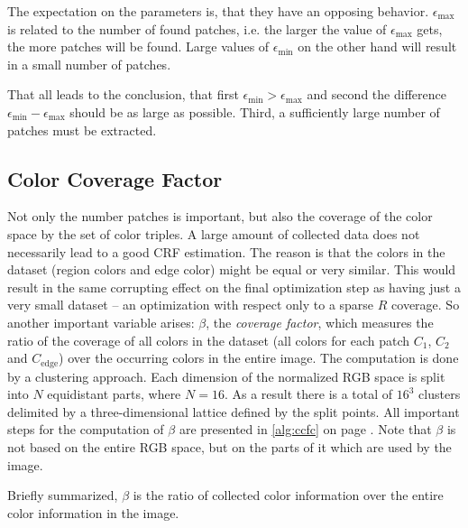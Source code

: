 The expectation on the parameters is, that they have an opposing behavior. $\epsilon_\text{max}$ is related to the number of found patches, \hbox{i.e.} the larger the value of $\epsilon_\text{max}$ gets, the more patches will be found. Large values of $\epsilon_\text{min}$ on the other hand will result in a small number of patches. 

That all leads to the conclusion, that first $\epsilon_\text{min} > \epsilon_\text{max}$ and second the difference $\epsilon_\text{min} - \epsilon_\text{max}$ should be as large as possible. Third, a sufficiently large number of patches must be extracted.  


\subsection{Color Coverage Factor}
\label{subsec:colorCoverageFactor}

Not only the number patches is important, but also the coverage of the color space by the set of color triples. A large amount of collected data does not necessarily lead to a good CRF estimation. The reason is that the colors in the dataset (region colors and edge color) might be equal or very similar. This would result in the same corrupting effect on the final optimization step as having just a very small dataset -- an optimization with respect only to a sparse $R$ coverage. So another important variable arises: $\beta$, the \emph{coverage factor}, which measures the ratio of the coverage of all colors in the dataset (all colors for each patch $C_1$, $C_2$ and $C_{\text{edge}}$) over the occurring colors in the entire image. The computation is done by a clustering approach. Each dimension of the normalized RGB space is split into $N$ equidistant parts, where $N = 16$. As a result there is a total of $16^3$ clusters delimited by a three-dimensional lattice defined by the split points. All important steps for the computation of $\beta$ are presented in \autoref{alg:ccfc} on page \pageref{alg:ccfc}. Note that $\beta$ is not based on the entire RGB space, but on the parts of it which are used by the image.

Briefly summarized, $\beta$ is the ratio of collected color information over the entire color information in the image.




